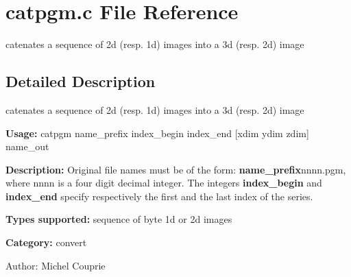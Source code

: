 \section{catpgm.c File Reference}
\label{catpgm_8c}
catenates a sequence of 2d (resp. 1d) images into a 3d (resp. 2d) image 



\subsection{Detailed Description}
catenates a sequence of 2d (resp. 1d) images into a 3d (resp. 2d) image 

{\bf Usage:} catpgm name\_\-prefix index\_\-begin index\_\-end [xdim ydim zdim] name\_\-out

{\bf Description:} Original file names must be of the form: {\bf name\_\-prefix}nnnn.pgm, where nnnn is a four digit decimal integer. The integers {\bf index\_\-begin} and {\bf index\_\-end} specify respectively the first and the last index of the series.

{\bf Types supported:} sequence of byte 1d or 2d images

{\bf Category:} convert

\begin{Desc}
\item[Author:]Michel Couprie \end{Desc}
